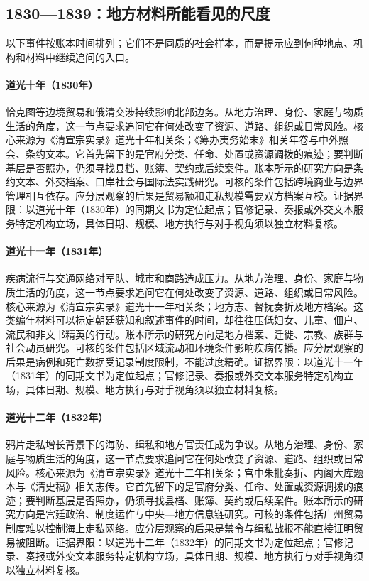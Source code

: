 \subsection{1830—1839：地方材料所能看见的尺度}
以下事件按账本时间排列；它们不是同质的社会样本，而是提示应到何种地点、机构和材料中继续追问的入口。
\hypertarget{social:EQ-1830-RUSSO-QING-TRADE}{}\paragraph{道光十年（1830年）}恰克图等边境贸易和俄清交涉持续影响北部边务。从地方治理、身份、家庭与物质生活的角度，这一节点要求追问它在何处改变了资源、道路、组织或日常风险。核心来源为《清宣宗实录》道光十年相关条；《筹办夷务始末》相关年卷与中外照会、条约文本。它首先留下的是官府分类、任命、处置或资源调拨的痕迹；要判断基层是否照办，仍须寻找县档、账簿、契约或后续案件。账本所示的研究方向是条约文本、外交档案、口岸社会与国际法实践研究。可核的条件包括跨境商业与边界管理相互依存。应分层观察的后果是贸易额和走私规模需要双方档案互校。证据界限：以道光十年（1830年）的同期文书为定位起点；官修记录、奏报或外交文本服务特定机构立场，具体日期、规模、地方执行与对手视角须以独立材料复核。
\hypertarget{social:EQ-1831-CENTRAL-ASIA-CHOLERA}{}\paragraph{道光十一年（1831年）}疾病流行与交通网络对军队、城市和商路造成压力。从地方治理、身份、家庭与物质生活的角度，这一节点要求追问它在何处改变了资源、道路、组织或日常风险。核心来源为《清宣宗实录》道光十一年相关条；地方志、督抚奏折及地方档案。这类编年材料可以标定朝廷获知和叙述事件的时间，却往往压低妇女、儿童、佃户、流民和非文书精英的行动。账本所示的研究方向是地方档案、迁徙、宗教、族群与社会动员研究。可核的条件包括区域流动和环境条件影响疾病传播。应分层观察的后果是病例和死亡数据受记录制度限制，不能过度精确。证据界限：以道光十一年（1831年）的同期文书为定位起点；官修记录、奏报或外交文本服务特定机构立场，具体日期、规模、地方执行与对手视角须以独立材料复核。
\hypertarget{social:EQ-1832-COASTAL-DEFENCE}{}\paragraph{道光十二年（1832年）}鸦片走私增长背景下的海防、缉私和地方官责任成为争议。从地方治理、身份、家庭与物质生活的角度，这一节点要求追问它在何处改变了资源、道路、组织或日常风险。核心来源为《清宣宗实录》道光十二年相关条；宫中朱批奏折、内阁大库题本与《清史稿》相关志传。它首先留下的是官府分类、任命、处置或资源调拨的痕迹；要判断基层是否照办，仍须寻找县档、账簿、契约或后续案件。账本所示的研究方向是宫廷政治、制度运作与中央—地方信息链研究。可核的条件包括广州贸易制度难以控制海上走私网络。应分层观察的后果是禁令与缉私战报不能直接证明贸易被阻断。证据界限：以道光十二年（1832年）的同期文书为定位起点；官修记录、奏报或外交文本服务特定机构立场，具体日期、规模、地方执行与对手视角须以独立材料复核。
